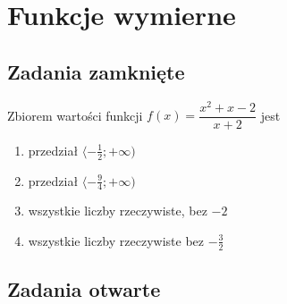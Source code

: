 \setcounter{parc}{0}
\addtocounter{chapc}{1}

\chapter{Funkcje wymierne}

\section{Zadania zamknięte}

\zadanie Zbiorem wartości funkcji $f(x) = \dfrac{x^2 + x - 2}{x + 2}$ jest
\begin{enumerate}[label=\alph*)]
	\item przedział $ \langle -\frac{1}{2}; +\infty ) $
	\item przedział $ \langle -\frac{9}{4}; +\infty ) $
	\item wszystkie liczby rzeczywiste, bez $-2$ %
	\item wszystkie liczby rzeczywiste bez $-\frac{3}{2}$
\end{enumerate}

\section{Zadania otwarte}

